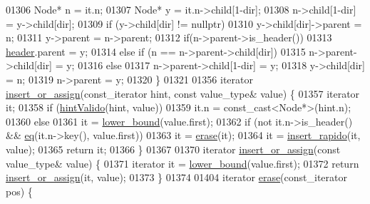 \begin{DoxyCode}
01306         Node* n = it.n;
01307         Node* y = it.n->child[1-dir];
01308         n->child[1-dir] = y->child[dir];
01309         \textcolor{keywordflow}{if} (y->child[dir] != \textcolor{keyword}{nullptr})
01310             y->child[dir]->parent = n;
01311         y->parent = n->parent;
01312         \textcolor{keywordflow}{if}(n->parent->is\_header())
01313             \hyperlink{classaed2_1_1map_a92d93f905c8ad73fba18fdc7e8915cce_a92d93f905c8ad73fba18fdc7e8915cce}{header}.parent = y;
01314         \textcolor{keywordflow}{else} if (n == n->parent->child[dir])
01315             n->parent->child[dir] = y;
01316         \textcolor{keywordflow}{else}
01317             n->parent->child[1-dir] = y;
01318         y->child[dir] = n;
01319         n->parent = y;
01320     \}
01321 
01356     iterator \hyperlink{classaed2_1_1map_a2ef6723c183916276b0afc4a4c721475_a2ef6723c183916276b0afc4a4c721475}{insert_or_assign}(const\_iterator hint, \textcolor{keyword}{const} value\_type& value) \{
01357         iterator it;
01358         \textcolor{keywordflow}{if} (\hyperlink{classaed2_1_1map_a45b04533e9acf27438813ab4a2604443_a45b04533e9acf27438813ab4a2604443}{hintValido}(hint, value))
01359             it.n = \textcolor{keyword}{const\_cast<}Node*\textcolor{keyword}{>}(hint.n);
01360         \textcolor{keywordflow}{else}
01361             it = \hyperlink{classaed2_1_1map_a3399d36fdd5a880b494f3a5795d3f18f_a3399d36fdd5a880b494f3a5795d3f18f}{lower_bound}(value.first);
01362         \textcolor{keywordflow}{if} (not it.n->is\_header() && \hyperlink{classaed2_1_1map_ab45cb28bb215cd229383d88b96b3f624_ab45cb28bb215cd229383d88b96b3f624}{eq}(it.n->key(), value.first))
01363             it = \hyperlink{classaed2_1_1map_ad8e796bf9c9c558e5ce6b61e116253fe_ad8e796bf9c9c558e5ce6b61e116253fe}{erase}(it);
01364         it = \hyperlink{classaed2_1_1map_a4b4f1e65ee9aeccee4046d53fd5fd8a4_a4b4f1e65ee9aeccee4046d53fd5fd8a4}{insert_rapido}(it, value);
01365         \textcolor{keywordflow}{return} it;
01366     \}
01367 
01370     iterator \hyperlink{classaed2_1_1map_a2ef6723c183916276b0afc4a4c721475_a2ef6723c183916276b0afc4a4c721475}{insert_or_assign}(\textcolor{keyword}{const} value\_type& value) \{
01371         iterator it = \hyperlink{classaed2_1_1map_a3399d36fdd5a880b494f3a5795d3f18f_a3399d36fdd5a880b494f3a5795d3f18f}{lower_bound}(value.first);
01372         \textcolor{keywordflow}{return} \hyperlink{classaed2_1_1map_a2ef6723c183916276b0afc4a4c721475_a2ef6723c183916276b0afc4a4c721475}{insert_or_assign}(it, value);
01373     \}
01374 
01404     iterator \hyperlink{classaed2_1_1map_ad8e796bf9c9c558e5ce6b61e116253fe_ad8e796bf9c9c558e5ce6b61e116253fe}{erase}(const\_iterator pos) \{

\end{DoxyCode}
